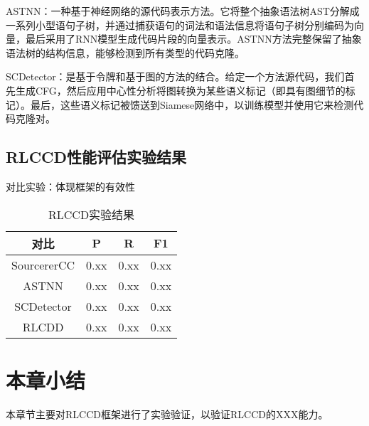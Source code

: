 ASTNN：一种基于神经网络的源代码表示方法。它将整个抽象语法树AST分解成一系列小型语句子树，并通过捕获语句的词法和语法信息将语句子树分别编码为向量，最后采用了RNN模型生成代码片段的向量表示。ASTNN方法完整保留了抽象语法树的结构信息，能够检测到所有类型的代码克隆。

SCDetector：是基于令牌和基于图的方法的结合。给定一个方法源代码，我们首先生成CFG，然后应用中心性分析将图转换为某些语义标记（即具有图细节的标记）。最后，这些语义标记被馈送到Siamese网络中，以训练模型并使用它来检测代码克隆对。

\subsection{RLCCD性能评估实验结果}

对比实验：体现框架的有效性


\begin{table}
  \centering
  \caption{RLCCD实验结果} %
  \begin{tabular*}{0.9\textwidth}{@{\extracolsep{\fill}}cccc}
  \toprule
    对比			&P		&R		&F1 \\
  \midrule
    SourcererCC			&0.xx	&0.xx		&0.xx \\
    ASTNN			&0.xx		&0.xx		&0.xx \\
    SCDetector			&0.xx	&0.xx		&0.xx \\
    RLCDD			&0.xx		&0.xx		&0.xx \\
  \bottomrule
  \end{tabular*}
\end{table}

\section{本章小结}
本章节主要对RLCCD框架进行了实验验证，以验证RLCCD的XXX能力。



